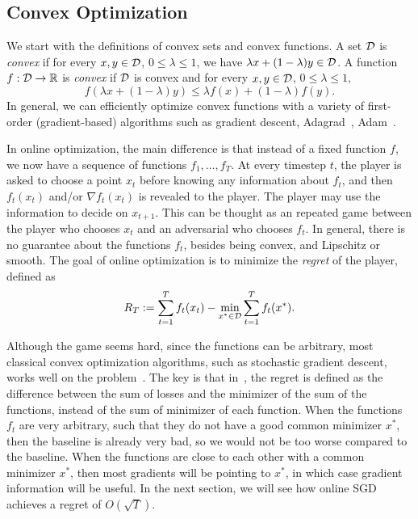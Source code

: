 \documentclass[11pt]{article}
\begin{document}
\subsection{Convex Optimization}
We start with the definitions of convex sets and convex functions.
A set $\mathcal{D}$ is \emph{convex} if for every $x, y \in \mathcal{D}$, $0 \le \lambda \le 1$, we have $\lambda x + (1 - \lambda) y \in \mathcal{D}$.
A function $f : \mathcal{D} \to \mathbb{R}$ is \emph{convex} if $\mathcal{D}$ is convex and for every $x, y \in \mathcal{D}$, $0 \le \lambda \le 1$,
\[
    f(\lambda x + (1 - \lambda) y) \le \lambda f(x) + (1 - \lambda) f(y).
\]
In general, we can efficiently optimize convex functions with a variety of first-order (gradient-based) algorithms such as gradient descent, Adagrad~\citep{duchi2011adaptive}, Adam~\citep{kingma2015adam}.

In online optimization, the main difference is that instead of a fixed function $f$, we now have a sequence of functions $f_1, \dots, f_T$. At every timestep $t$, the player is asked to choose a point $x_t$ before knowing any information about $f_t$, and then $f_t(x_t)$ and/or $\nabla f_t(x_t)$ is revealed to the player. The player may use the information to decide on $x_{t+1}$. This can be thought as an repeated game between the player who chooses $x_t$ and an adversarial who chooses $f_t$.
In general, there is no guarantee about the functions $f_t$, besides being convex, and Lipschitz or smooth.
The goal of online optimization is to minimize the \emph{regret} of the player, defined as
\begin{equation}\label{eq:regret}
    R_T := \sum_{t=1}^T f_t(x_t) - \min_{x^* \in \mathcal{D}} \sum_{t=1}^T f_t(x^*).
\end{equation}

Although the game seems hard, since the functions can be arbitrary, most classical convex optimization algorithms, such as stochastic gradient descent, works well on the problem~\citep{zinkevich2003online}. The key is that in~, the regret is defined as the difference between the sum of losses and the minimizer of the sum of the functions, instead of the sum of minimizer of each function.
When the functions $f_t$ are very arbitrary, such that they do not have a good common minimizer $x^*$, then the baseline is already very bad, so we would not be too worse compared to the baseline.
When the functions are close to each other with a common minimizer $x^*$, then most gradients will be pointing to $x^*$, in which case gradient information will be useful.
In the next section, we will see how online SGD achieves a regret of $O(\sqrt{T})$.
\end{document}
